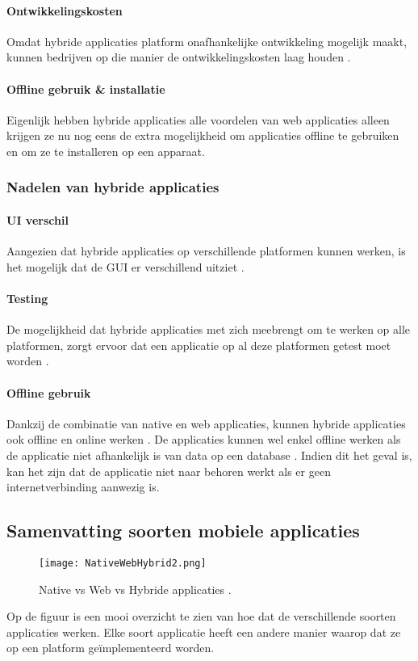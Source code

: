 \paragraph{Ontwikkelingskosten}
Omdat hybride applicaties platform onafhankelijke ontwikkeling mogelijk maakt, kunnen 
bedrijven op die manier de ontwikkelingskosten laag houden \autocite{Budiu2016}. 

\paragraph{Offline gebruik \& installatie}
Eigenlijk hebben hybride applicaties alle voordelen van web applicaties alleen krijgen ze 
nu nog eens de extra mogelijkheid om applicaties offline te gebruiken en om ze te 
installeren op een apparaat.

\subsubsection{Nadelen van hybride applicaties}
\paragraph{UI verschil}
Aangezien dat hybride applicaties op verschillende platformen kunnen werken, is het 
mogelijk dat de GUI er verschillend uitziet \autocite{sgshradha2019}. 

\paragraph{Testing}
De mogelijkheid dat hybride applicaties met zich meebrengt om te werken op alle platformen, 
zorgt ervoor dat een applicatie op al deze platformen getest moet worden \autocite{sgshradha2019}.

\paragraph{Offline gebruik}
Dankzij de combinatie van native en web applicaties, kunnen hybride applicaties ook offline 
en online werken \autocite{Khan2021}. De applicaties kunnen wel enkel offline werken als de 
applicatie niet afhankelijk is van data op een database \autocite{sgshradha2019}. Indien 
dit het geval is, kan het zijn dat de applicatie niet naar behoren werkt als er geen 
internetverbinding aanwezig is.

\subsection{Samenvatting soorten mobiele applicaties}
\begin{figure}[H]
    \centering
    \texttt{[image: NativeWebHybrid2.png]}
    \caption{Native vs Web vs Hybride applicaties \parencite{Merenych2021}.}
    \label{fig:NativeWebHybride}
\end{figure}
Op de figuur is een mooi overzicht te zien van hoe dat de verschillende 
soorten applicaties werken. Elke soort applicatie heeft een andere manier waarop dat ze 
op een platform geïmplementeerd worden.

